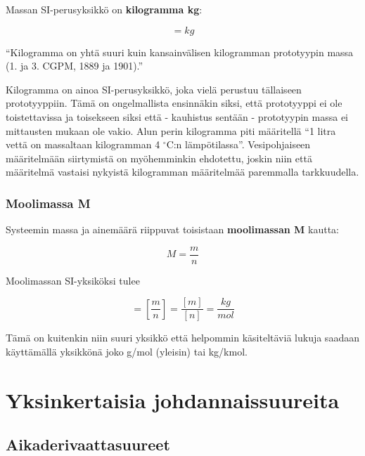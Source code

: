 \documentclass[12pt,a4paper,finnish]{book}
\begin{document}
Massan SI-perusyksikkö on \textbf{kilogramma kg}:

\begin{equation}
 [m] = kg
\end{equation}

``Kilogramma on yhtä suuri kuin kansainvälisen kilogramman prototyypin massa (1. ja 3. CGPM, 1889 ja 1901).''

Kilogramma on ainoa SI-perusyksikkö, joka vielä perustuu tällaiseen prototyyppiin. Tämä on ongelmallista ensinnäkin 
siksi, että prototyyppi ei ole toistettavissa ja toisekseen siksi että - kauhistus sentään - prototyypin massa 
ei mittausten mukaan ole vakio. Alun perin kilogramma piti määritellä ``1 litra vettä on massaltaan kilogramman 
4 $^{\circ}$C:n lämpötilassa''. Vesipohjaiseen määritelmään siirtymistä on myöhemminkin ehdotettu, joskin niin että 
määritelmä vastaisi nykyistä kilogramman määritelmää paremmalla tarkkuudella.

\subsection{Moolimassa M}

Systeemin massa ja ainemäärä riippuvat toisistaan \textbf{moolimassan M} kautta:

\begin{equation}
 M = \frac{m}{n}
\end{equation}

Moolimassan SI-yksiköksi tulee

\begin{equation}
 [M] = \left[\frac{m}{n}\right] = \frac{[m]}{[n]} = \frac{kg}{mol}
\end{equation}

Tämä on kuitenkin niin suuri yksikkö että helpommin käsiteltäviä lukuja saadaan käyttämällä yksikkönä joko 
g/mol (yleisin) tai kg/kmol.

\chapter{Yksinkertaisia johdannaissuureita} %

\section{Aikaderivaattasuureet} %

\end{document}
